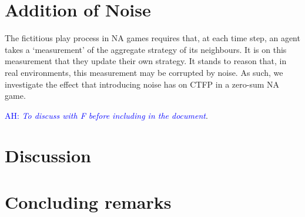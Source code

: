 \documentclass{article}
\theoremstyle{definition}
\newcommand{\ah}[1]{\textcolor{blue}{AH: \textit{#1}}}
\begin{document}
	\section{Addition of Noise}

	The fictitious play process in NA games requires that, at each time step, an agent takes a `measurement' of the aggregate strategy of its neighbours. It is on this measurement that they update their own strategy. It stands to reason that, in real environments, this measurement may be corrupted by noise. As such, we investigate the effect that introducing noise has on CTFP in a zero-sum NA game.

	\ah{To discuss with F before including in the document}.
	

	\section{Discussion}

	\section{Concluding remarks}
\end{document}
